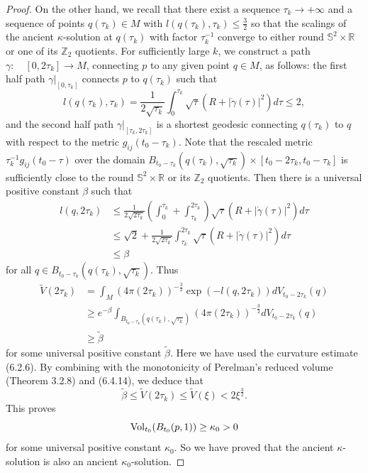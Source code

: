 \begin{proof}
On the other hand, we recall that there exist a sequence
$\tau_k\rightarrow+\infty$ and a sequence of points $q(\tau_k)\in
M$ with $l(q(\tau_k),\tau_k)\le\frac{3}{2}$ so that the scalings
of the ancient $\kappa$-solution at $q(\tau_k)$ with factor
$\tau_k^{-1}$ converge to either round $\mathbb{S}^2\times
\mathbb{R}$ or one of its $\mathbb{Z}_2$ quotients. For
sufficiently large $k$, we construct a path
$\gamma:\quad[0,2\tau_k]\rightarrow M$, connecting $p$ to any
given point $q\in M$, as follows: the first half path
$\gamma|_{[0,\tau_k]}$ connects $p$ to $q(\tau_k)$ such that
$$
l(q(\tau_k),\tau_k)
=\frac{1}{2\sqrt{\tau_k}}\int_0^{\tau_k}\sqrt{\tau}
(R+|\dot{\gamma}(\tau)|^2)d\tau\le2,
$$
and the second half path $\gamma|_{[\tau_k,2\tau_k]}$ is a
shortest geodesic connecting $q(\tau_k)$ to $q$ with respect to
the metric $g_{ij}(t_0-\tau_k)$. Note that the rescaled metric
$\tau_k^{-1}g_{ij}(t_0-\tau)$ over the domain
$B_{t_0-\tau_k}(q(\tau_k),\sqrt{\tau_k})\times[t_0-2\tau_k,t_0-\tau_k]$
is sufficiently close to the round $\mathbb{S}^2\times \mathbb{R}$
or its $\mathbb{Z}_2$ quotients. Then there is a universal
positive constant $\beta$ such that
\begin{align*}
l(q,2\tau_k)& \le \frac{1}{2\sqrt{2\tau_k}}\left(\int_0^{\tau_k}
+\int_{\tau_k}^{2\tau_k}\right)\sqrt{\tau}
(R+|\dot{\gamma}(\tau)|^2)d\tau\\
&  \le \sqrt{2}+\frac{1}{2\sqrt{2\tau_k}}
\int_{\tau_k}^{2\tau_k}\sqrt{\tau}(R+|\dot{\gamma}(\tau)|^2)d\tau\\
&  \le \beta
\end{align*}
for all $q\in B_{t_0-\tau_k}(q(\tau_k),\sqrt{\tau_k})$. Thus
\begin{align*}
\widetilde{V}(2\tau_k)&  = \int_M (4\pi(2\tau_k))^{-\frac{3}{2}}
\exp(-l(q,2\tau_k))dV_{t_0-2\tau_k}(q)\\
&  \ge e^{-\beta}\int_{B_{t_0-\tau_k}(q(\tau_k),
\sqrt{\tau_k})}(4\pi(2\tau_k))^{-\frac{3}{2}}dV_{t_0-2\tau_k}(q)\\
&  \ge \tilde{\beta}
\end{align*}
for some universal positive constant $\tilde{\beta}$. Here we have
used the curvature estimate (6.2.6). By combining with the
monotonicity of Perelman's reduced volume (Theorem 3.2.8) and
(6.4.14), we deduce that
$$
\tilde{\beta}\le\widetilde{V}(2\tau_k)
\le\widetilde{V}(\xi)<2\xi^\frac{3}{2}.
$$
This proves
$$
\operatorname{Vol}_{t_0}(B_{t_0}(p,1))\ge \kappa_0>0
$$
for some universal positive constant $\kappa_0$. So we have proved
that the ancient $\kappa$-solution is also an ancient
$\kappa_0$-solution.
\end{proof}

